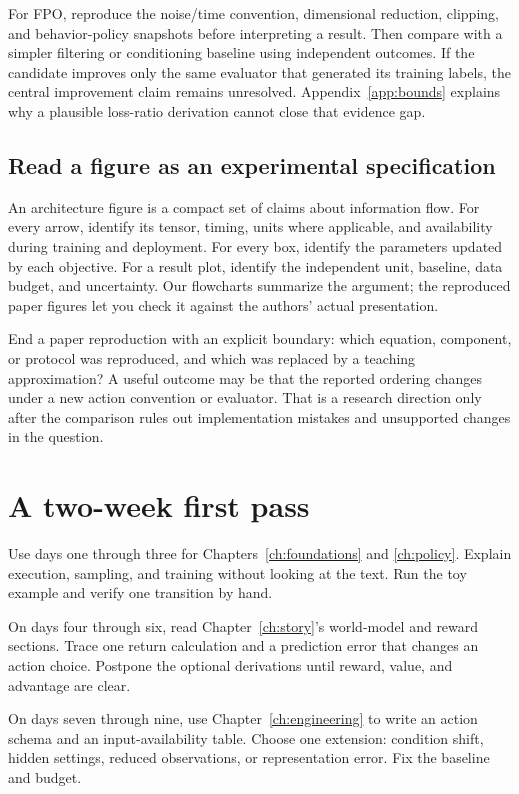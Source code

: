 For FPO, reproduce the noise/time convention, dimensional reduction, clipping, and behavior-policy snapshots before interpreting a result. Then compare with a simpler filtering or conditioning baseline using independent outcomes. If the candidate improves only the same evaluator that generated its training labels, the central improvement claim remains unresolved. Appendix~\ref{app:bounds} explains why a plausible loss-ratio derivation cannot close that evidence gap.

\subsection{Read a figure as an experimental specification}
An architecture figure is a compact set of claims about information flow. For every arrow, identify its tensor, timing, units where applicable, and availability during training and deployment. For every box, identify the parameters updated by each objective. For a result plot, identify the independent unit, baseline, data budget, and uncertainty. Our flowcharts summarize the argument; the reproduced paper figures let you check it against the authors' actual presentation.

End a paper reproduction with an explicit boundary: which equation, component, or protocol was reproduced, and which was replaced by a teaching approximation? A useful outcome may be that the reported ordering changes under a new action convention or evaluator. That is a research direction only after the comparison rules out implementation mistakes and unsupported changes in the question.

\section{A two-week first pass}
Use days one through three for Chapters~\ref{ch:foundations} and \ref{ch:policy}. Explain execution, sampling, and training without looking at the text. Run the toy example and verify one transition by hand.

On days four through six, read Chapter~\ref{ch:story}'s world-model and reward sections. Trace one return calculation and a prediction error that changes an action choice. Postpone the optional derivations until reward, value, and advantage are clear.

On days seven through nine, use Chapter~\ref{ch:engineering} to write an action schema and an input-availability table. Choose one extension: condition shift, hidden settings, reduced observations, or representation error. Fix the baseline and budget.

